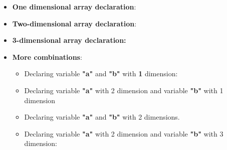 \setlength{\columnsep}{3pt}
\begin{flushleft}
	\begin{itemize}
		\item \textbf{One dimensional array declaration}:
		\bigskip
		\bigskip
		
		\bigskip
		\item \textbf{Two-dimensional array declaration}:
		\bigskip
		
		
		\newpage
		\item \textbf{3-dimensional array declaration:}
		\bigskip
		
		\bigskip		
		\item \textbf{More combinations}:
		\begin{itemize}
			\item Declaring variable \textbf{"a"} and \textbf{"b"} with \textbf{1} dimension:
			\bigskip
			\bigskip
			\item Declaring variable \textbf{"a"} with 2 dimension and variable \textbf{"b"} with 1 dimension
			\bigskip
			
			\item Declaring variable \textbf{"a"} and \textbf{"b"} with 2 dimensions.
			\bigskip
			
			\item Declaring variable \textbf{"a"} with 2 dimension and variable \textbf{"b"} with 3 dimension:
			
			\bigskip
			
		\end{itemize}
		
	\end{itemize}
	
	
	
\end{flushleft}
